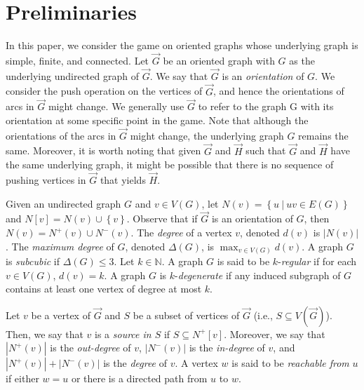 \documentclass[a4paper,12pt]{amsart}
\newcommand{\set}[1]{\left\{#1\right\}}
\let\leq\leqslant
\begin{document}
\section{Preliminaries}\label{S:prelim}
In this paper, we consider the game on oriented graphs whose underlying graph is simple, finite, and connected. Let $\overrightarrow{G}$ be an oriented graph with $G$ as the underlying undirected graph of $\overrightarrow{G}$. We say that $\overrightarrow{G}$ is an \textit{orientation} of $G$. We consider the push operation on the vertices of $\overrightarrow{G}$, and hence the orientations of arcs in $\overrightarrow{G}$ might change. We generally use $\overrightarrow{G}$ to refer to the graph G with its orientation at some specific point in the game. Note that although the orientations of the arcs in $\overrightarrow{G}$ might change, the underlying graph $G$ remains the same. Moreover, it is worth noting that given $\overrightarrow{G}$ and $\overrightarrow{H}$ such that $\overrightarrow{G}$ and $\overrightarrow{H}$ have the same underlying graph, it might be possible that there is no sequence of pushing vertices in $\overrightarrow{G}$ that yields $\overrightarrow{H}$. %

Given an undirected graph $G$ and $v\in V(G)$, let $N(v) = \set{u~|~uv\in E(G)}$ and $N[v] = N(v)\cup \set{v}$. Observe that if $\overrightarrow{G}$ is an orientation of $G$, then $N(v) = N^+(v) \cup N^-(v)$. The \textit{degree} of a vertex $v$, denoted $d(v)$ is $|N(v)|$. The \textit{maximum degree} of $G$, denoted $\Delta(G)$,  is $\max_{v\in V(G)} d(v)$.  A graph $G$ is \textit{subcubic} if $\Delta(G) \leq 3$. Let $k\in \mathbb{N}$. A graph $G$ is said to be $k$-\textit{regular} if for each $v\in V(G)$, $d(v) = k$. A graph $G$ is $k$-\textit{degenerate} if any induced subgraph of $G$ contains at least one vertex of degree at most $k$.  

Let $v$ be a vertex of $\overrightarrow{G}$ and $S$ be a subset of vertices of $\overrightarrow{G}$ (i.e., $S\subseteq V(\overrightarrow{G})$). Then, we say that $v$ is a {\em source in $S$} if $S\subseteq N^+[v]$. Moreover, we say that $|N^+(v)|$ is the \textit{out-degree} of $v$, $|N^-(v)|$ is the \textit{in-degree} of $v$, and $|N^+(v)|+|N^-(v)|$ is the \textit{degree} of $v$. A vertex $w$ is said to be \textit{reachable from} $u$ if either $w=u$ or there is a directed path from $u$ to $w$. 
\end{document}
